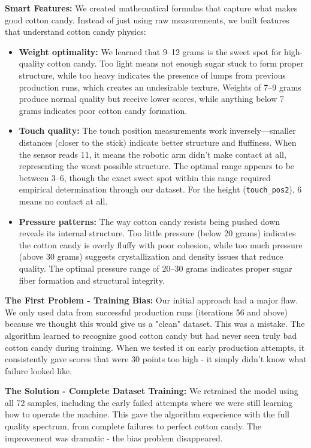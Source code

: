 \textbf{Smart Features:} We created mathematical formulas that capture what makes good cotton candy. Instead of just using raw measurements, we built features that understand cotton candy physics:
\begin{itemize}
    \item \textbf{Weight optimality:} We learned that 9--12 grams is the sweet spot for high-quality cotton candy. Too light means not enough sugar stuck to form proper structure, while too heavy indicates the presence of lumps from previous production runs, which creates an undesirable texture. Weights of 7--9 grams produce normal quality but receive lower scores, while anything below 7 grams indicates poor cotton candy formation.
    \item \textbf{Touch quality:} The touch position measurements work inversely---smaller distances (closer to the stick) indicate better structure and fluffiness. When the sensor reads 11, it means the robotic arm didn't make contact at all, representing the worst possible structure. The optimal range appears to be between 3--6, though the exact sweet spot within this range required empirical determination through our dataset. For the height (\texttt{touch\_pos2}), 6 means no contact at all.
    \item \textbf{Pressure patterns:} The way cotton candy resists being pushed down reveals its internal structure. Too little pressure (below 20 grams) indicates the cotton candy is overly fluffy with poor cohesion, while too much pressure (above 30 grams) suggests crystallization and density issues that reduce quality. The optimal pressure range of 20--30 grams indicates proper sugar fiber formation and structural integrity.
\end{itemize}

\textbf{The First Problem - Training Bias:} Our initial approach had a major flaw. We only used data from successful production runs (iterations 56 and above) because we thought this would give us a "clean" dataset. This was a mistake. The algorithm learned to recognize good cotton candy but had never seen truly bad cotton candy during training. When we tested it on early production attempts, it consistently gave scores that were 30 points too high - it simply didn't know what failure looked like.

\textbf{The Solution - Complete Dataset Training:} We retrained the model using all 72 samples, including the early failed attempts where we were still learning how to operate the machine. This gave the algorithm experience with the full quality spectrum, from complete failures to perfect cotton candy. The improvement was dramatic - the bias problem disappeared.

